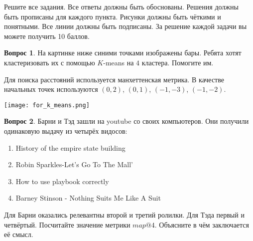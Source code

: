 \documentclass[12pt]{article}
\theoremstyle{definition}
\newtheorem{question}{Вопрос}
\begin{document}
Решите все задания. Все ответы должны быть обоснованы. Решения должны быть прописаны для каждого пункта. Рисунки должны быть чёткими и понятными. Все линии должны быть подписаны. За решение каждой задачи вы можете получить 10 баллов.


\begin{question}
На картинке ниже синими точками изображены бары. Ребята хотят кластеризовать их с помощью $K$-means на $4$ кластера. Помогите им.

Для поиска расстояний используется манхеттенская метрика. В качестве начальных точек используются $(0, 2)$, $(0, 1)$, $(−1, −3)$, $(−1, −2)$.

\begin{center}
    \texttt{[image: for\_k\_means.png]}
\end{center}
\end{question}


\newpage 

\begin{question}
Барни и Тэд зашли на youtube со своих компьютеров. Они получили одинаковую выдачу из четырёх видосов: 

\begin{enumerate}
    \item  History of the empire state building
    \item  Robin Sparkles-Let's Go To The Mall'
    \item  How to use playbook correctly
    \item  Barney Stinson - Nothing Suits Me Like A Suit
\end{enumerate}

Для Барни оказались релевантны второй и третий ролилки. Для Тэда первый и четвёртый. Посчитайте значение метрики $map@4.$ Объясните в чём заключается её смысл. 
\end{question}
\end{document}
